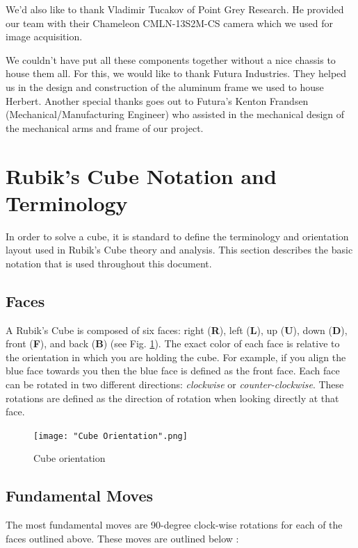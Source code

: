 \documentclass[final, letterpaper, 10 pt, conference, onecolumn]{IEEEtran}
\begin{document}
We'd also like to thank Vladimir Tucakov of Point Grey Research. He provided our team with their Chameleon CMLN-13S2M-CS camera which we used for image acquisition.

We couldn't have put all these components together without a nice chassis to house them all. For this, we would like to thank Futura Industries. They helped us in the design and construction of the aluminum frame we used to house Herbert. Another special thanks goes out to Futura's Kenton Frandsen (Mechanical/Manufacturing Engineer) who assisted in the mechanical design of the mechanical arms and frame of our project.

\printbibliography

\appendix
\section{Rubik's Cube Notation and Terminology}
\label{sec:Appendix A}
In order to solve a cube, it is standard to define the terminology and orientation layout used in Rubik's Cube theory and analysis. This section describes the basic notation that is used throughout this document.

\subsection{Faces}
A Rubik's Cube is composed of six faces: right (\textbf{R}), left (\textbf{L}), up (\textbf{U}), down (\textbf{D}), front (\textbf{F}), and back (\textbf{B}) (see Fig. \ref{fig:Cube Orientation}). The exact color of each face is relative to the orientation in which you are holding the cube. For example, if you align the blue face towards you then the blue face is defined as the front face. Each face can be rotated in two different directions: \textit{clockwise} or \textit{counter-clockwise}. These rotations are defined as the direction of rotation when looking directly at that face.

\begin{figure}[!hb]
\centering
\texttt{[image: "Cube Orientation".png]}
\caption{Cube orientation}
\label{fig:Cube Orientation}
\end{figure}

\subsection{Fundamental Moves}
\label{sec:fundamental moves}
The most fundamental moves are 90-degree clock-wise rotations for each of the faces outlined above. These moves are outlined below \cite{BasicCubeNotation}:
\end{document}
